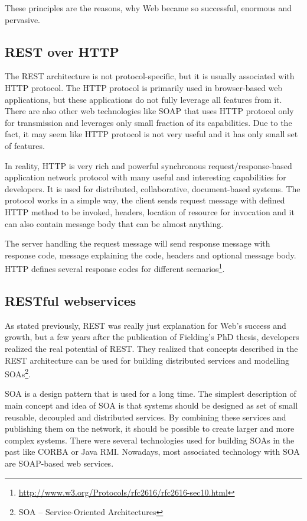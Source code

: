 \documentclass[12pt,final,oneside]{fithesis2}
\begin{document}
These principles are the reasons, why Web became so successful, enormous and pervasive.\cite{resteasy-book}

\subsection{REST over HTTP}
The REST architecture is not protocol-specific, but it is usually associated with HTTP protocol. The HTTP protocol is primarily used in browser-based web applications, but these applications do not fully leverage all features from it. There are also other web technologies like SOAP that uses HTTP protocol only for transmission and leverages only small fraction of its capabilities. Due to the fact, it may seem like HTTP protocol is not very useful and it has only small set of features. 

In reality, HTTP is very rich and powerful synchronous request/response-based application network protocol with many useful and interesting capabilities for developers. It is used for distributed, collaborative, document-based systems. The protocol works in a simple way, the client sends request message with defined HTTP method to be invoked, headers, location of resource for invocation and it can also contain message body that can be almost anything.

The server handling the request message will send response message with response code, message explaining the code, headers and optional message body. HTTP defines several response codes for different scenarios\footnote{\url{http://www.w3.org/Protocols/rfc2616/rfc2616-sec10.html}}.\cite{resteasy-book}

\subsection{RESTful webservices}
As stated previously, REST was really just explanation for Web's success and growth, but a few years after the publication of Fielding's PhD thesis, developers realized the real potential of REST. They realized that concepts described in the REST architecture can be used for building distributed services and modelling SOAs\footnote{SOA -- Service-Oriented Architectures}. 

SOA is a design pattern that is used for a long time. The simplest description of main concept and idea of SOA is that systems should be designed as set of small reusable, decoupled and distributed services. By combining these services and publishing them on the network, it should be possible to create larger and more complex systems. There were several technologies used for building SOAs in the past like CORBA or Java RMI. Nowadays, most associated technology with SOA are SOAP-based web services.  
\end{document}
